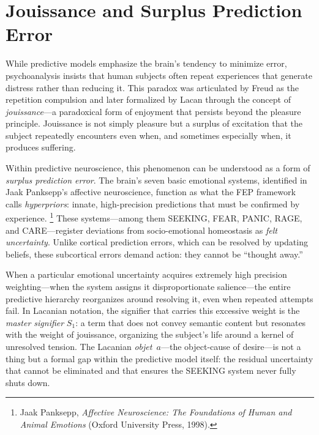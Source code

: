 \documentclass[12pt,a4paper]{article}
\begin{document}
\section{Jouissance and Surplus Prediction Error}

While predictive models emphasize the brain's tendency to minimize error, psychoanalysis insists
that human subjects often repeat experiences that generate distress rather than reducing it.
This paradox was articulated by Freud as the repetition compulsion and later formalized by
Lacan through the concept of \emph{jouissance}---a paradoxical form of enjoyment that persists
beyond the pleasure principle. Jouissance is not simply pleasure but a surplus of excitation
that the subject repeatedly encounters even when, and sometimes especially when, it produces
suffering.

Within predictive neuroscience, this phenomenon can be understood as a form of
\emph{surplus prediction error}. The brain's seven basic emotional systems, identified in
Jaak Panksepp's affective neuroscience, function as what the FEP framework calls
\emph{hyperpriors}: innate, high-precision predictions that must be confirmed by
experience.%
\footnote{Jaak Panksepp, \emph{Affective Neuroscience: The Foundations of Human and Animal
Emotions} (Oxford University Press, 1998).}
These systems---among them SEEKING, FEAR, PANIC, RAGE, and CARE---register deviations
from socio-emotional homeostasis as \emph{felt uncertainty}. Unlike cortical prediction errors,
which can be resolved by updating beliefs, these subcortical errors demand action: they cannot
be ``thought away.''

When a particular emotional uncertainty acquires extremely high precision weighting---when the
system assigns it disproportionate salience---the entire predictive hierarchy reorganizes around
resolving it, even when repeated attempts fail. In Lacanian notation, the signifier that carries
this excessive weight is the \emph{master signifier} $S_1$: a term that does not convey
semantic content but resonates with the weight of jouissance, organizing the subject's life
around a kernel of unresolved tension. The Lacanian \emph{objet~$a$}---the object-cause of
desire---is not a thing but a formal gap within the predictive model itself: the residual
uncertainty that cannot be eliminated and that ensures the SEEKING system never fully shuts down.
\end{document}
